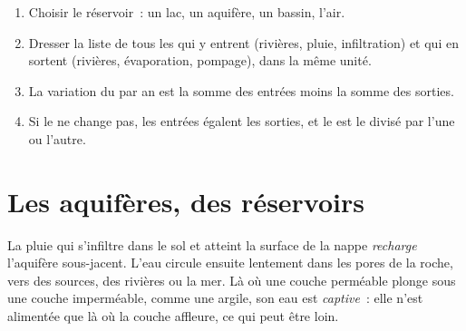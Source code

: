\begin{method}\label{met:g10:freshwater-resources:budget}
\begin{enumerate}
  \item Choisir le réservoir~: un lac, un aquifère, un bassin, l'air.
  \item Dresser la liste de tous les  qui y entrent (rivières, pluie,
        infiltration) et qui en sortent (rivières, évaporation, pompage),
        dans la même unité.
  \item La variation du  par an est la somme des entrées moins la
        somme des sorties.
  \item Si le  ne change pas, les entrées égalent les sorties, et le
         est le  divisé par l'une ou l'autre.
\end{enumerate}
\end{method}

\section{Les aquifères, des réservoirs}

La pluie qui s'infiltre dans le sol et atteint la surface de la nappe
\emph{recharge} l'aquifère sous-jacent. L'eau circule ensuite lentement
dans les pores de la roche, vers des sources, des rivières ou la mer. Là où
une couche perméable plonge sous une couche imperméable, comme une argile,
son eau est \emph{captive}~: elle n'est alimentée que là où la couche
affleure, ce qui peut être loin.

